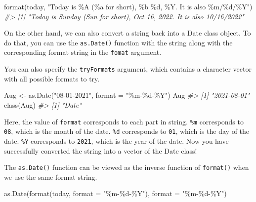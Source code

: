 \documentclass[
]{book}
\newenvironment{Shaded}{\begin{snugshade}}{\end{snugshade}}
\newcommand{\AttributeTok}[1]{\textcolor[rgb]{0.77,0.63,0.00}{#1}}
\newcommand{\CommentTok}[1]{\textcolor[rgb]{0.56,0.35,0.01}{\textit{#1}}}
\newcommand{\FunctionTok}[1]{\textcolor[rgb]{0.00,0.00,0.00}{#1}}
\newcommand{\NormalTok}[1]{#1}
\newcommand{\OtherTok}[1]{\textcolor[rgb]{0.56,0.35,0.01}{#1}}
\newcommand{\StringTok}[1]{\textcolor[rgb]{0.31,0.60,0.02}{#1}}
\begin{document}
\begin{Shaded}
\begin{Highlighting}[]
\FunctionTok{format}\NormalTok{(today, }\StringTok{"Today is \%A (\%a for short), \%b \%d, \%Y. It is also \%m/\%d/\%Y"}\NormalTok{)}
\CommentTok{\#\textgreater{} [1] "Today is Sunday (Sun for short), Oct 16, 2022. It is also 10/16/2022"}
\end{Highlighting}
\end{Shaded}

On the other hand, we can also convert a string back into a Date class object. To do that, you can use the \texttt{as.Date()} function with the string along with the corresponding format string in the \texttt{fomat} argument.

You can also specify the \texttt{tryFormats} argument, which contains a character vector with all possible formats to try.

\begin{Shaded}
\begin{Highlighting}[]
\NormalTok{Aug }\OtherTok{\textless{}{-}} \FunctionTok{as.Date}\NormalTok{(}\StringTok{"08{-}01{-}2021"}\NormalTok{, }\AttributeTok{format =} \StringTok{"\%m{-}\%d{-}\%Y"}\NormalTok{)}
\NormalTok{Aug}
\CommentTok{\#\textgreater{} [1] "2021{-}08{-}01"}
\FunctionTok{class}\NormalTok{(Aug)}
\CommentTok{\#\textgreater{} [1] "Date"}
\end{Highlighting}
\end{Shaded}

Here, the value of \texttt{format} corresponds to each part in string. \texttt{\%m} corresponds to \texttt{08}, which is the month of the date. \texttt{\%d} corresponds to \texttt{01}, which is the day of the date. \texttt{\%Y} corresponds to \texttt{2021}, which is the year of the date. Now you have successfully converted the string into a vector of the Date class!

The \texttt{as.Date()} function can be viewed as the inverse function of \texttt{format()} when we use the same format string.

\begin{Shaded}
\begin{Highlighting}[]
\FunctionTok{as.Date}\NormalTok{(}\FunctionTok{format}\NormalTok{(today, }\AttributeTok{format =} \StringTok{"\%m{-}\%d{-}\%Y"}\NormalTok{), }\AttributeTok{format =} \StringTok{"\%m{-}\%d{-}\%Y"}\NormalTok{)}
\end{Highlighting}
\end{Shaded}
\end{document}
